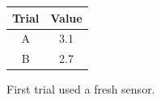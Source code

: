 \documentclass{article}
\begin{document}
\begin{threeparttable}
\caption{Small measured values}
\begin{tabular}{cc}
\hline
Trial & Value \\
\hline
A\tnote{a} & 3.1 \\
B & 2.7 \\
\hline
\end{tabular}
\begin{tablenotes}
\item[a] First trial used a fresh sensor.
\end{tablenotes}
\end{threeparttable}
\end{document}

